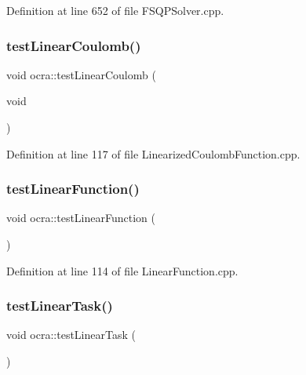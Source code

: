 Definition at line 652 of file F\+S\+Q\+P\+Solver.\+cpp.

\hypertarget{namespaceocra_a5973aff53b16d90407c82dcb6210c48e}{}\label{namespaceocra_a5973aff53b16d90407c82dcb6210c48e} 
\subsubsection{\texorpdfstring{test\+Linear\+Coulomb()}{testLinearCoulomb()}}
{\footnotesize\ttfamily void ocra\+::test\+Linear\+Coulomb (\begin{DoxyParamCaption}\item[{void}]{ }\end{DoxyParamCaption})}



Definition at line 117 of file Linearized\+Coulomb\+Function.\+cpp.

\hypertarget{namespaceocra_a7341356a4b7a68447912171e62c727d3}{}\label{namespaceocra_a7341356a4b7a68447912171e62c727d3} 
\subsubsection{\texorpdfstring{test\+Linear\+Function()}{testLinearFunction()}}
{\footnotesize\ttfamily void ocra\+::test\+Linear\+Function (\begin{DoxyParamCaption}{ }\end{DoxyParamCaption})}



Definition at line 114 of file Linear\+Function.\+cpp.

\hypertarget{namespaceocra_ab690dbe78d926d15e444e73a6f67faf7}{}\label{namespaceocra_ab690dbe78d926d15e444e73a6f67faf7} 
\subsubsection{\texorpdfstring{test\+Linear\+Task()}{testLinearTask()}}
{\footnotesize\ttfamily void ocra\+::test\+Linear\+Task (\begin{DoxyParamCaption}{ }\end{DoxyParamCaption})}



